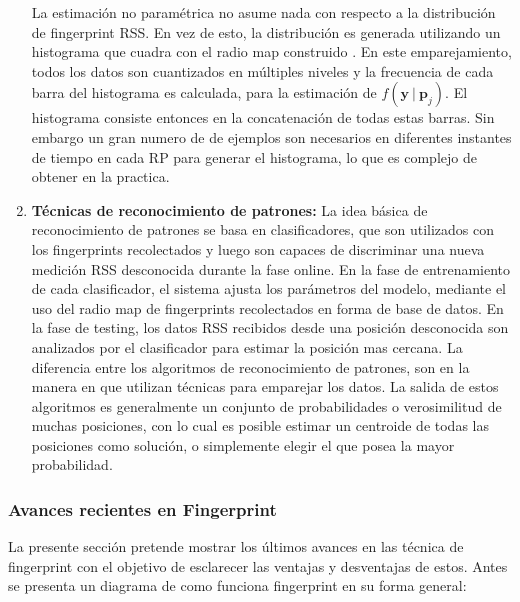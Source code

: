 \begin{enumerate}
La estimación no paramétrica no asume nada con respecto a la distribución de fingerprint RSS. En vez de esto, la distribución es generada utilizando un histograma que cuadra con el radio map construido \citep{Haeberlen:2004:PRL:1023720.1023728, Ladd:2002:RLS:570645.570674}. En este emparejamiento, todos los datos son cuantizados en múltiples niveles y la frecuencia de cada barra del histograma es calculada, para la estimación de \(f( \textbf{y} \ \vert \ \textbf{p}_{j})\). El histograma consiste entonces en la concatenación de todas estas barras. Sin embargo un gran numero de de ejemplos son necesarios en diferentes instantes de tiempo en cada RP para generar el histograma, lo que es complejo de obtener en la practica.

\item \textbf{Técnicas de reconocimiento de patrones:} La idea básica de reconocimiento de patrones se basa en clasificadores, que son utilizados con los fingerprints recolectados y luego son capaces de discriminar una nueva medición RSS desconocida durante la fase online. En la fase de entrenamiento de cada clasificador, el sistema ajusta los parámetros del modelo, mediante el uso del radio map de fingerprints recolectados en forma de base de datos. En la fase de testing, los datos RSS recibidos desde una posición desconocida son analizados por el clasificador para estimar la posición mas cercana. La diferencia entre los algoritmos de reconocimiento de patrones, son en la manera en que utilizan técnicas para emparejar los datos. La salida de estos algoritmos es generalmente un conjunto de probabilidades o verosimilitud de muchas posiciones, con lo cual es posible estimar un centroide de todas las posiciones como solución, o simplemente elegir el que posea la mayor probabilidad.
\end{enumerate}


\subsubsection{Avances recientes en Fingerprint}

La presente sección pretende mostrar los últimos avances en las técnica de fingerprint con el objetivo de esclarecer las ventajas y desventajas de estos. Antes se presenta un diagrama de como funciona fingerprint en su forma general:

